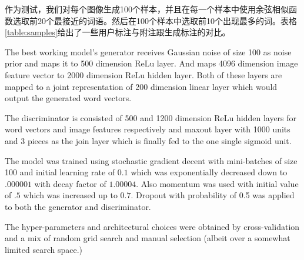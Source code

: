 \documentclass{article} %
\begin{document}
作为测试，我们对每个图像生成100个样本，并且在每一个样本中使用余弦相似函数选取前20个最接近的词语。然后在100个样本中选取前10个出现最多的词。表格\ref{table:samples}给出了一些用户标注与附注跟生成标注的对比。


The best working model's generator receives Gaussian noise of size 100 as noise prior and maps it to 500 dimension ReLu layer.
And maps 4096 dimension image feature vector to 2000 dimension ReLu hidden layer.
Both of these layers are mapped to a joint representation of 200 dimension linear layer which would output the generated word vectors.

The discriminator is consisted of 500 and 1200 dimension ReLu hidden layers for word vectors
and image features respectively and maxout layer with 1000 units and 3 pieces as the join layer which is finally fed to
the one single sigmoid unit.

The model was trained using stochastic gradient decent with mini-batches of size 100
and initial learning rate of $0.1$
which was exponentially decreased down to $.000001$ with decay factor of $1.00004$.
Also momentum was used with initial value of $.5$ which was increased up to $0.7$.
Dropout with probability of 0.5 was applied to both the generator and discriminator.

The hyper-parameters and architectural choices were obtained by cross-validation
 and a mix of random grid search and manual selection (albeit over a somewhat limited search space.)
\end{document}
